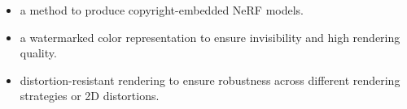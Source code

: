 \documentclass[10pt,twocolumn,letterpaper]{article}
\newcommand{\Fref}[1]{Figure~\ref{#1}}
\newcommand{\renjie}[1]{\textcolor{red}{{#1}}}
\begin{document}
\begin{itemize}
    \item a method to produce copyright-embedded NeRF models.
    
    \item a watermarked color representation to ensure invisibility and high rendering quality.
    
    
    \item distortion-resistant rendering to ensure robustness across different rendering strategies or 2D distortions.
\end{itemize}

\end{document}
